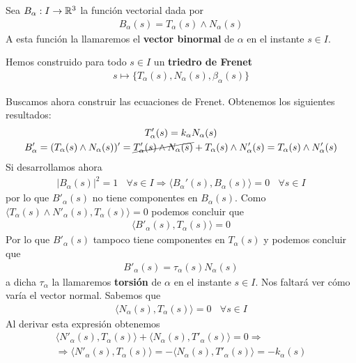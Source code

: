 Sea $B_\alpha:I\to \mathbb{R}^3$ la función vectorial dada por 
\begin{gather*}
    B_\alpha(s) = T_\alpha(s) \wedge N_\alpha(s)
\end{gather*} 
A esta función la llamaremos el \textbf{vector binormal} de $\alpha$ en el instante $s\in I$.

Hemos construido para todo $s\in I$ un \textbf{triedro de Frenet}
\begin{gather*}
    s \mapsto \{T_\alpha(s), N_\alpha(s), \beta_\alpha(s)\}
\end{gather*}

Buscamos ahora construir las {ecuaciones de Frenet}. Obtenemos los siguientes resultados:
\begin{gather*}
    T'_\alpha(s) = k_\alpha N_\alpha(s)\\
    B'_\alpha = (T_\alpha(s) \wedge N_\alpha(s))' = \cancel{T'_\alpha(s)\wedge N_\alpha(s)} + T_\alpha(s)\wedge N'_\alpha(s) = T_\alpha(s)\wedge N'_\alpha(s)
\end{gather*}
Si desarrollamos ahora 
\begin{gather*}
    |B_\alpha(s)|^2 = 1 \ \ \ \ \forall s \in I \Rightarrow \langle B_\alpha'(s), B_\alpha(s) \rangle = 0 \ \ \ \ \forall s \in I
\end{gather*}
por lo que $B'_\alpha(s)$ no tiene componentes en $B_\alpha(s)$. Como $\langle T_\alpha(s) \wedge N'_\alpha(s), T_\alpha(s)\rangle = 0$ podemos concluir que
\begin{gather*}
    \langle B'_\alpha(s), T_\alpha(s) \rangle = 0
\end{gather*}
Por lo que $B'_\alpha(s)$ tampoco tiene componentes en $T_\alpha(s)$ y podemos concluir que 
\begin{gather*}
    B'_\alpha(s) = \tau_\alpha(s) N_\alpha(s)
\end{gather*}
a dicha $\tau_\alpha$ la llamaremos \textbf{torsión} de $\alpha$ en el instante $s\in I$. Nos faltará ver cómo varía el vector normal. Sabemos que 
\begin{gather*}
    \langle N_\alpha(s), T_\alpha(s) \rangle = 0 \ \ \ \ \forall s \in I
\end{gather*}
Al derivar esta expresión obtenemos 
\begin{gather*}
    \langle N'_\alpha(s), T_\alpha(s) \rangle + \langle N_\alpha(s), T'_\alpha(s) \rangle = 0 \Rightarrow \\
    \Rightarrow \langle N'_\alpha(s), T_\alpha(s) \rangle = - \langle N_\alpha(s), T'_\alpha(s) \rangle = -k_\alpha(s)
\end{gather*}
